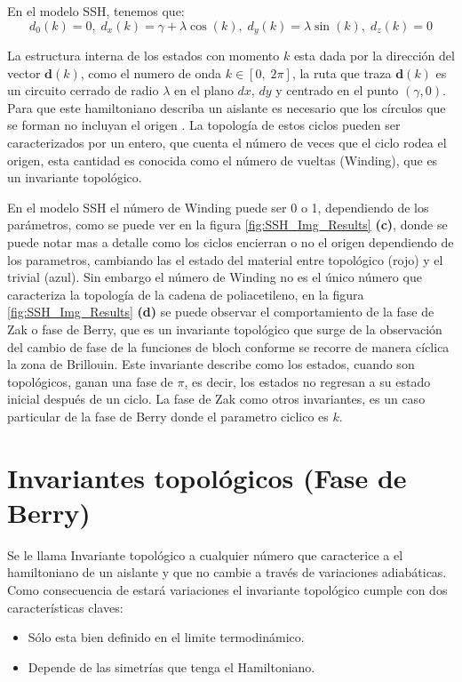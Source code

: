 En el modelo SSH, tenemos que:
\begin{equation}
  d_0(k) = 0 ,\; d_x(k) = \gamma + \lambda \cos(k) , \; d_y(k) = \lambda \sin(k), \; d_z(k) = 0  
\end{equation}

La estructura interna de los estados con momento $k$ esta dada por la dirección del vector $\mathbf{d}(k)$, como el numero de onda $k  \in \left[ 0, \; 2\pi \right]$, la ruta que traza $\mathbf{d}(k)$ es un circuito cerrado de radio $\lambda$ en el plano $dx, \,dy$ y centrado en el punto $(\gamma, 0)$. Para que este hamiltoniano describa un aislante es necesario que los círculos que se forman no incluyan el origen \cite{Asboth2015}. La topología de estos ciclos pueden ser caracterizados por un entero, que cuenta el número de veces que el ciclo rodea el origen, esta cantidad es conocida como el número de vueltas (Winding), que es un invariante topológico.

En el modelo SSH el número de Winding puede ser 0 o 1, dependiendo de los parámetros, como se puede ver en la figura \ref{fig:SSH_Img_Results} \textbf{(c)}, donde se puede notar mas a detalle como los ciclos encierran o no el origen dependiendo de los parametros, cambiando las el estado del material entre topológico (rojo) y el trivial (azul). Sin embargo el número de Winding no es el único número que caracteriza la topología de la cadena de poliacetileno, en la figura \ref{fig:SSH_Img_Results} \textbf{(d)} se puede observar el comportamiento de la fase de Zak o fase de Berry, que es un invariante topológico que surge de la observación del cambio de fase de la funciones de bloch conforme se recorre de manera cíclica la zona de Brillouin. Este invariante describe como los estados, cuando son topológicos, ganan una fase de $\pi$, es decir, los estados no regresan a su estado inicial después de un ciclo. La fase de Zak como otros invariantes, es un caso particular de la fase de Berry donde el parametro ciclico es $k$.

\section{Invariantes topológicos (Fase de Berry)}

Se le llama Invariante topológico a cualquier número que caracterice a el hamiltoniano de un aislante y que no cambie a través de variaciones adiabáticas. Como consecuencia de estará variaciones el invariante topológico cumple con dos características claves:
\begin{itemize}
    \item Sólo esta bien definido en el limite termodinámico.
    \item Depende de las simetrías que tenga el Hamiltoniano.
\end{itemize}

